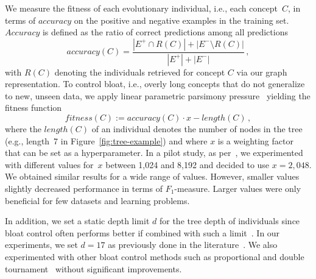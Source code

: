 We measure the fitness of each evolutionary individual, i.e., each concept~$C$, in terms of $\mathit{accuracy}$ on the positive and negative examples in the training set. $\mathit{Accuracy}$ is defined as the ratio of correct predictions among all predictions
\begin{equation}
\mathit{accuracy}(C) = \frac{| E^{+} \cap R(C)| + |E^{-} \setminus R(C)|}{|E^{+}| + |E^{-}|}\,,
\end{equation}
with $R(C)$ denoting the individuals retrieved for concept $C$ via our graph representation. To control bloat, i.e., overly long concepts that do not generalize to new, unseen data, we apply linear parametric parsimony pressure~\citep{Luke2006Bloat} yielding the fitness function
\begin{equation}
		\mathit{fitness}(C) := \mathit{accuracy}(C) \cdot x - \mathit{length}(C)\,,
\end{equation}
where the $\mathit{length}(C)$ of an individual denotes the number of nodes in the tree (e.g., length~7 in Figure~\ref{fig:tree-example}) and where $x$ is a weighting factor that can be set as a hyperparameter. In a pilot study, as per~\citet{Luke2006Bloat}, we experimented with different values for~$x$ between 1,024 and 8,192 and decided to use $x=2,048$. We obtained similar results for a wide range of values. However, smaller values slightly decreased performance in terms of $F_1$-measure. Larger values were only beneficial for few datasets and learning problems.

In addition, we set a static depth limit $d$ for the tree depth of individuals since bloat control often performs better if combined with such a limit~\citep{Luke2006Bloat}. In our experiments, we set $d=17$ as previously done in the literature~\citep{Luke2006Bloat, Koza1992GP}. We also experimented with other bloat control methods such as proportional and double tournament~\citep{Luke2006Bloat} without significant improvements.
